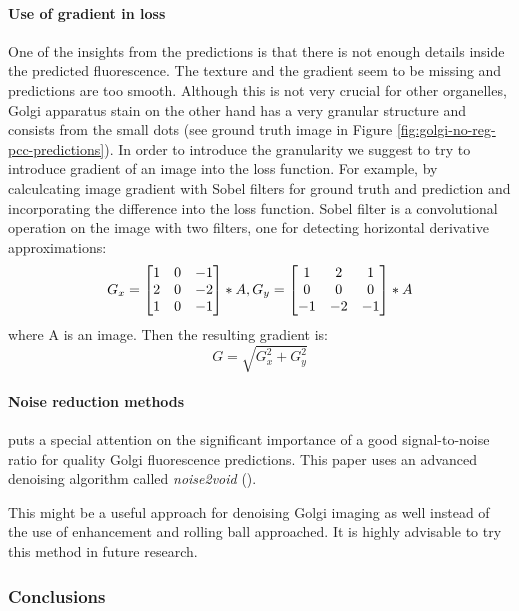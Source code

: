         \paragraph{Use of gradient in loss}
            One of the insights from the predictions is that there is not enough details inside the predicted fluorescence. The texture and the gradient seem to be missing and predictions are too smooth. Although this is not very crucial for other organelles, Golgi apparatus stain on the other hand has a very granular structure and consists from the small dots (see ground truth image in Figure \ref{fig:golgi-no-reg-pcc-predictions}). In order to introduce the granularity we suggest to try to introduce gradient of an image into the loss function. For example, by calculcating image gradient with Sobel filters for ground truth and prediction and incorporating the difference into the loss function. Sobel filter is a convolutional operation on the image with two filters, one for detecting horizontal derivative approximations:
            \begin{equation}
                G_x = \begin{bmatrix}
                    1 & 0 & -1\\
                    2 & 0 & -2\\
                    1 & 0 & -1
                    \end{bmatrix} * A, \smallskip
                G_y = \begin{bmatrix}
                    1 & 2 & 1\\
                    0 & 0 & 0\\
                    -1 & -2 & -1
                \end{bmatrix} * A
            \end{equation}
            where A is an image. Then the resulting gradient is:
            \begin{equation}
                G = \sqrt{G_x^2 + G_y^2}
            \end{equation}
        \paragraph{Noise reduction methods}
            \cite{Cheng_2021} puts a special attention on the significant importance of a good signal-to-noise ratio for quality Golgi fluorescence predictions. This paper uses an advanced denoising algorithm called \textit{noise2void} (\cite{noise2void}). 

            This might be a useful approach for denoising Golgi imaging as well instead of the use of enhancement and rolling ball approached. It is highly advisable to try this method in future research.

    \subsubsection{Conclusions}
        